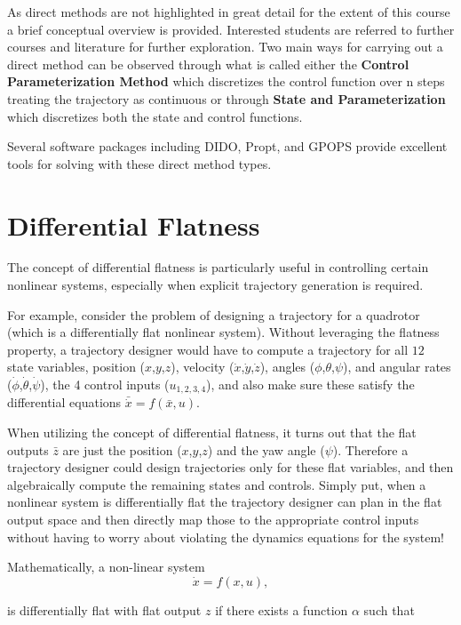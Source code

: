 \documentclass[twoside]{article}
\begin{document}
As direct methods are not highlighted in great detail for the extent of this course a brief conceptual overview is provided. Interested students are referred to further courses and literature for further exploration. Two main ways for carrying out a direct method can be observed through what is called either the \textbf{Control Parameterization Method} which discretizes the control function over n steps treating the trajectory as continuous or through \textbf{State and Parameterization} which discretizes both the state and control functions.

Several software packages including DIDO, Propt, and GPOPS provide excellent tools for solving with these direct method types.

\section{Differential Flatness}
The concept of differential flatness is particularly useful in controlling certain nonlinear systems, especially when explicit trajectory generation is required.

For example, consider the problem of designing a trajectory for a quadrotor (which is a differentially flat nonlinear system). Without leveraging the flatness property, a trajectory designer would have to compute a trajectory for all $12$ state variables, position ($x$,$y$,$z$), velocity ($\dot{x}$,$\dot{y}$,$\dot{z}$), angles ($\phi$,$\theta$,$\psi$), and angular rates ($\dot{\phi}$,$\dot{\theta}$,$\dot{\psi}$), the 4 control inputs ($u_{1,2,3,4}$), and also make sure these satisfy the differential equations $\bar{\dot{x}} = f(\bar{x},u)$.

When utilizing the concept of differential flatness, it turns out that the flat outputs $\bar{z}$ are just the position ($x$,$y$,$z$) and the yaw angle ($\psi$). Therefore a trajectory designer could design trajectories only for these flat variables, and then algebraically compute the remaining states and controls. Simply put, when a nonlinear system is differentially flat the trajectory designer can plan in the flat output space and then directly map those to the appropriate control inputs without having to worry about violating the dynamics equations for the system!

Mathematically, a non-linear system
\begin{equation}
\dot{x} = f(x,u),
\end{equation}

is differentially flat with flat output $z$ if there exists a function $\alpha$ such that
\end{document}
